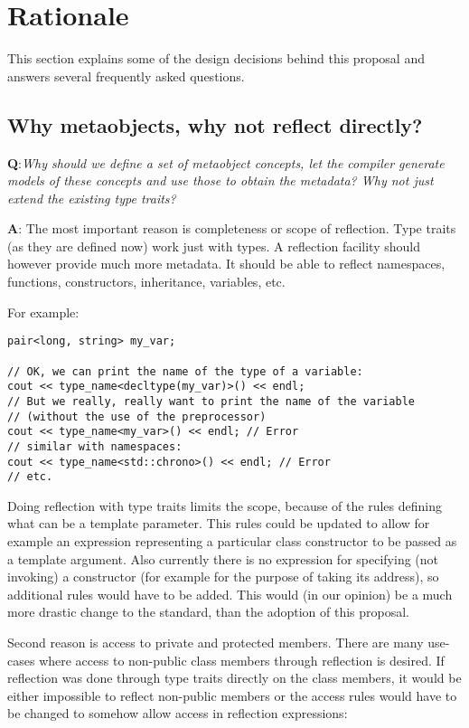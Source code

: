 \section{Rationale}

This section explains some of the design decisions behind this proposal and
answers several frequently asked questions.

\subsection{Why metaobjects, why not reflect directly?}

{\textbf Q:}{\em Why should we define a set of metaobject concepts, let the compiler generate
models of these concepts and use those to obtain the metadata? Why not just extend the existing
type traits?}

{\textbf A:} The most important reason is completeness or scope of reflection.
Type traits (as they are defined now) work just with types. A reflection facility should
however provide much more metadata.
It should be able to reflect namespaces, functions, constructors, inheritance, variables, etc.

For example:

\begin{verbatim}
pair<long, string> my_var;

// OK, we can print the name of the type of a variable:
cout << type_name<decltype(my_var)>() << endl;
// But we really, really want to print the name of the variable
// (without the use of the preprocessor)
cout << type_name<my_var>() << endl; // Error
// similar with namespaces:
cout << type_name<std::chrono>() << endl; // Error
// etc.
\end{verbatim}


Doing reflection with type traits limits the scope, because of the rules defining what
can be a template parameter. This rules could be updated to allow for example an expression
representing a particular class constructor to  be passed as a template argument.
Also currently there is no expression for specifying (not invoking) a constructor
(for example for the purpose of taking its address), so additional rules would have
to be added.
This would (in our opinion) be a much more drastic change to the standard, than
the adoption of this proposal.

Second reason is access to private and protected members. There are many use-cases where
access to non-public class members through reflection is desired. If reflection was
done through type traits directly on the class members, it would be either impossible
to reflect non-public members or the access rules would have to be changed to somehow
allow access in reflection expressions:


